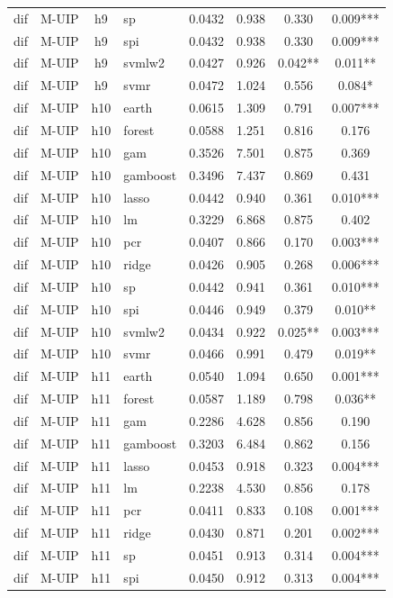 \begin{ThreePartTable}
\begin{longtable}[t]{llclcccc}
dif & M-UIP & h9 & sp & 0.0432 & 0.938 & 0.330 & 0.009***\\
dif & M-UIP & h9 & spi & 0.0432 & 0.938 & 0.330 & 0.009***\\
dif & M-UIP & h9 & svmlw2 & 0.0427 & 0.926 & 0.042** & 0.011**\\
dif & M-UIP & h9 & svmr & 0.0472 & 1.024 & 0.556 & 0.084*\\
\addlinespace
dif & M-UIP & h10 & earth & 0.0615 & 1.309 & 0.791 & 0.007***\\
dif & M-UIP & h10 & forest & 0.0588 & 1.251 & 0.816 & 0.176\\
dif & M-UIP & h10 & gam & 0.3526 & 7.501 & 0.875 & 0.369\\
dif & M-UIP & h10 & gamboost & 0.3496 & 7.437 & 0.869 & 0.431\\
dif & M-UIP & h10 & lasso & 0.0442 & 0.940 & 0.361 & 0.010***\\
dif & M-UIP & h10 & lm & 0.3229 & 6.868 & 0.875 & 0.402\\
dif & M-UIP & h10 & pcr & 0.0407 & 0.866 & 0.170 & 0.003***\\
dif & M-UIP & h10 & ridge & 0.0426 & 0.905 & 0.268 & 0.006***\\
dif & M-UIP & h10 & sp & 0.0442 & 0.941 & 0.361 & 0.010***\\
dif & M-UIP & h10 & spi & 0.0446 & 0.949 & 0.379 & 0.010**\\
dif & M-UIP & h10 & svmlw2 & 0.0434 & 0.922 & 0.025** & 0.003***\\
dif & M-UIP & h10 & svmr & 0.0466 & 0.991 & 0.479 & 0.019**\\
\addlinespace
dif & M-UIP & h11 & earth & 0.0540 & 1.094 & 0.650 & 0.001***\\
dif & M-UIP & h11 & forest & 0.0587 & 1.189 & 0.798 & 0.036**\\
dif & M-UIP & h11 & gam & 0.2286 & 4.628 & 0.856 & 0.190\\
dif & M-UIP & h11 & gamboost & 0.3203 & 6.484 & 0.862 & 0.156\\
dif & M-UIP & h11 & lasso & 0.0453 & 0.918 & 0.323 & 0.004***\\
dif & M-UIP & h11 & lm & 0.2238 & 4.530 & 0.856 & 0.178\\
dif & M-UIP & h11 & pcr & 0.0411 & 0.833 & 0.108 & 0.001***\\
dif & M-UIP & h11 & ridge & 0.0430 & 0.871 & 0.201 & 0.002***\\
dif & M-UIP & h11 & sp & 0.0451 & 0.913 & 0.314 & 0.004***\\
dif & M-UIP & h11 & spi & 0.0450 & 0.912 & 0.313 & 0.004***\\

\end{longtable}
\end{ThreePartTable}
